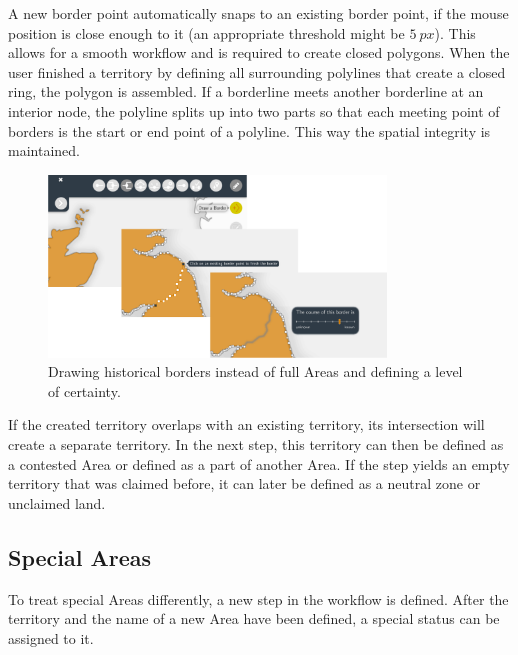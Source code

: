 A new border point automatically snaps to an existing border point, if the mouse position is close enough to it (an appropriate threshold might be $5~px$). This allows for a smooth workflow and is required to create closed polygons. When the user finished a territory by defining all surrounding polylines that create a closed ring, the polygon is assembled. If a borderline meets another borderline at an interior node, the polyline splits up into two parts so that each meeting point of borders is the start or end point of a polyline. This way the spatial integrity is maintained.

\begin{figure}[ht]
  \vspace{1em}
  \centering
  \includegraphics[width = 0.8\textwidth]{graphics/extensions/new_territory_tool}
  \caption{Drawing historical borders instead of full Areas and defining a level of certainty.}
  \label{fig:uncertainty_new_territory_tool}
\end{figure}

If the created territory overlaps with an existing territory, its intersection will create a separate territory. In the next step, this territory can then be defined as a contested Area or defined as a part of another Area. If the step yields an empty territory that was claimed before, it can later be defined as a neutral zone or unclaimed land.


\subsection{Special Areas} %
\label{sub:special_areas}

To treat special Areas differently, a new step in the workflow is defined. After the territory and the name of a new Area have been defined, a special status can be assigned to it.

